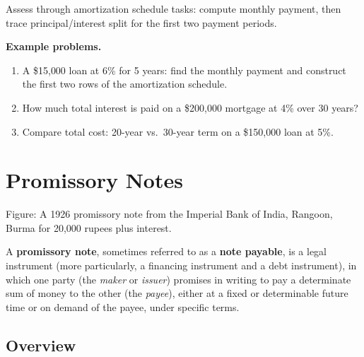 Assess through amortization schedule tasks: compute monthly payment, then
trace principal/interest split for the first two payment periods.

\textbf{Example problems.}
\begin{enumerate}
    \item A \$15{,}000 loan at 6\% for 5 years: find the monthly payment
          and construct the first two rows of the amortization schedule.
    \item How much total interest is paid on a \$200{,}000 mortgage at
          4\% over 30 years?
    \item Compare total cost: 20-year vs.\ 30-year term on a
          \$150{,}000 loan at 5\%.
\end{enumerate}



\section{Promissory Notes}
\label{sec:prom-7e42}





Figure: A 1926 promissory note from the Imperial Bank of India, Rangoon, Burma for 20,000
rupees plus interest.



A \textbf{promissory note}, sometimes referred to as a \textbf{note payable}, is a legal
instrument (more particularly, a financing instrument and a debt instrument), in which one
party (the \textit{maker} or \textit{issuer}) promises in writing to pay a determinate sum
of money to the other (the \textit{payee}), either at a fixed or determinable future time
or on demand of the payee, under specific terms.




\subsection{Overview}
\label{sss:over-bce0}




